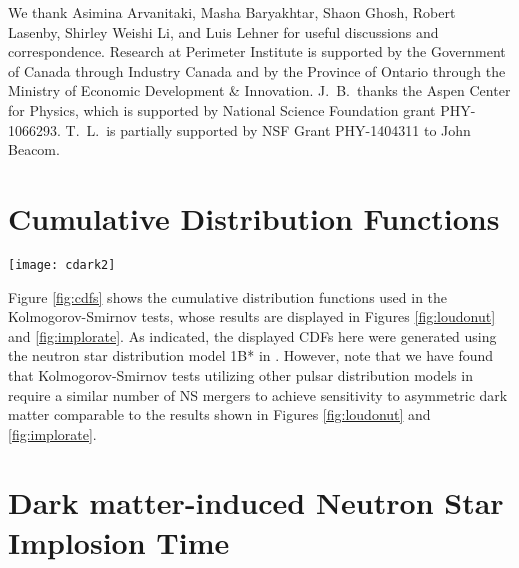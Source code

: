 \documentclass[nofootinbib,longbibliography,prd,floatfix,superscriptaddress,twocolumn]{revtex4-1}
\begin{document}
\acknowledgments We thank Asimina Arvanitaki, Masha Baryakhtar, Shaon Ghosh, Robert Lasenby, Shirley Weishi Li, and Luis Lehner for useful discussions and correspondence. Research at Perimeter Institute is supported by the Government of Canada through Industry Canada and by the Province of Ontario through the Ministry of Economic Development \& Innovation. J.~B.~thanks the Aspen Center for Physics, which is supported by National Science Foundation grant PHY-1066293. T.~L.~is partially supported by NSF Grant PHY-1404311 to John Beacom. 

\appendix

\section{Cumulative Distribution Functions}
\label{app:cdfs}
\begin{figure*}[t!]
\texttt{[image: cdark2]}
\caption{Cumulative distribution functions corresponding to the Kolmogorov-Smirnov tests shown in  Figures \ref{fig:loudonut} and \ref{fig:implorate} are given, for merger kilonovae (left) and fast radio bursts (right). Both merger kilonovae and FRBs are assumed to follow the distribution of NSs in an MWEG (dotted purple line labeled 1B*). This distribution can be compared with distributions for representative NS-imploding dark matter models, ADM1, ADM2, and ADM3, defined by $t_{\rm c} \rho_{\rm x} /v_{\rm x}  = 3$, $15$, and $100$ $\rm Gyr~GeV/cm^3~ (200 ~km/s)^{-1}$ respectively, see Eq. (2) of the main text.}
\label{fig:cdfs}
\end{figure*}

Figure \ref{fig:cdfs} shows the cumulative distribution functions used in the Kolmogorov-Smirnov tests, whose results are displayed in Figures \ref{fig:loudonut} and \ref{fig:implorate}. As indicated, the displayed CDFs here were generated using the neutron star distribution model 1B* in \cite{2010A&A...510A..23S}. However, note that we have found that Kolmogorov-Smirnov tests utilizing other pulsar distribution models in \cite{2010A&A...510A..23S} require a similar number of NS mergers to achieve sensitivity to asymmetric dark matter comparable to the results shown in  Figures \ref{fig:loudonut} and \ref{fig:implorate}.

\section{Dark matter-induced Neutron Star Implosion Time}
\label{app:ADM}
\end{document}
